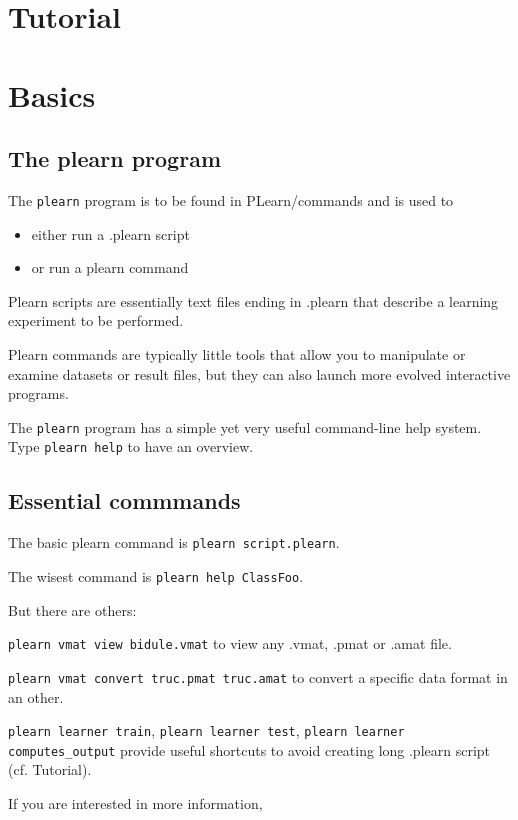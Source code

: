 \documentclass[11pt]{book}
\begin{document}
\chapter{Tutorial}




\chapter{Basics}

\section{The plearn program}

The {\tt plearn} program is to be found in PLearn/commands and is used to
\begin{itemize}
\item either run a .plearn script 
\item or run a plearn command
\end{itemize}

Plearn scripts are essentially text files ending in .plearn that describe
a learning experiment to be performed.

Plearn commands are typically little tools that allow you to manipulate or examine
datasets or result files, but they can also launch more evolved interactive programs.

The {\tt plearn} program has a simple yet very useful command-line help system.
Type \verb!plearn help! to have an overview.

\section{Essential commmands}

The basic plearn command is \texttt{plearn script.plearn}.

The wisest command is \texttt{plearn help ClassFoo}.

But there are others:

\texttt{plearn vmat view bidule.vmat} to view any .vmat, .pmat or .amat file.

\texttt{plearn vmat convert truc.pmat truc.amat} to convert a specific data format in an other.

\texttt{plearn learner train}, \texttt{plearn learner test}, \texttt{plearn learner computes\_output} provide useful shortcuts to avoid creating long .plearn script (cf. Tutorial).

If you are interested in more information,
\end{document}
